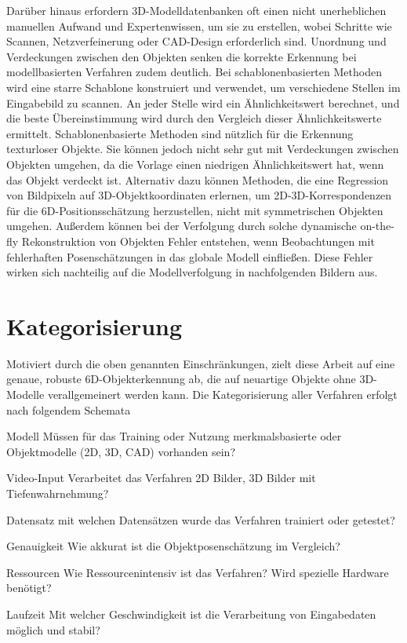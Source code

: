 \documentclass[a4paper, 11pt]{article}
\begin{document}
\begin{multicols*}{2}
    Darüber hinaus erfordern 3D-Modelldatenbanken oft einen nicht unerheblichen manuellen Aufwand und Expertenwissen, um sie zu erstellen, wobei Schritte wie Scannen, Netzverfeinerung oder CAD-Design erforderlich sind.
    Unordnung und Verdeckungen zwischen den Objekten senken die korrekte Erkennung bei modellbasierten Verfahren zudem deutlich.
    Bei schablonenbasierten Methoden wird eine starre Schablone konstruiert und verwendet, um verschiedene Stellen im Eingabebild zu scannen. An jeder Stelle wird ein Ähnlichkeitswert berechnet, und die beste Übereinstimmung wird durch den Vergleich dieser Ähnlichkeitswerte ermittelt.
    Schablonenbasierte Methoden sind nützlich für die Erkennung texturloser Objekte. Sie können jedoch nicht sehr gut mit Verdeckungen zwischen Objekten umgehen, da die Vorlage einen niedrigen Ähnlichkeitswert hat, wenn das Objekt verdeckt ist.
    Alternativ dazu können Methoden, die eine Regression von Bildpixeln auf 3D-Objektkoordinaten erlernen, um 2D-3D-Korrespondenzen für die 6D-Positionsschätzung herzustellen, nicht mit symmetrischen Objekten umgehen.
    Außerdem können bei der Verfolgung durch solche dynamische on-the-fly Rekonstruktion von Objekten Fehler entstehen, wenn Beobachtungen mit fehlerhaften Posenschätzungen in das globale Modell einfließen. Diese Fehler wirken sich nachteilig auf die Modellverfolgung in nachfolgenden Bildern aus.

    \section{Kategorisierung}
    Motiviert durch die oben genannten Einschränkungen, zielt diese Arbeit auf eine genaue, robuste 6D-Objekterkennung ab, die auf neuartige Objekte ohne 3D-Modelle verallgemeinert werden kann.
    Die Kategorisierung aller Verfahren erfolgt nach folgendem Schemata
    \begin{description*}
        \item[Modell] Müssen für das Training oder Nutzung merkmalsbasierte oder Objektmodelle (2D, 3D, CAD) vorhanden sein?
        \item[Video-Input] Verarbeitet das Verfahren 2D Bilder, 3D Bilder mit Tiefenwahrnehmung?
        \item[Datensatz] mit welchen Datensätzen wurde das Verfahren trainiert oder getestet?
        \item[Genauigkeit] Wie akkurat ist die Objektposenschätzung im Vergleich?
        \item[Ressourcen] Wie Ressourcenintensiv ist das Verfahren? Wird spezielle Hardware benötigt?
        \item[Laufzeit] Mit welcher Geschwindigkeit ist die Verarbeitung von Eingabedaten möglich und stabil?
    \end{description*}


\end{multicols*}
\end{document}
